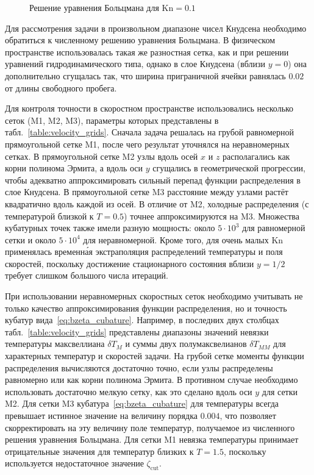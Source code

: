 \documentclass[
aps,%
12pt,%
final,%
notitlepage,%
oneside,%
onecolumn,%
nobibnotes,%
nofootinbib,%
superscriptaddress,%
noshowpacs,%
showkeys,%
floatfix,%
tightenlines,%
centertags]%
{revtex4}
\newcommand{\Kn}{\mathrm{Kn}}
\begin{document}
\begin{figure}
    \centering
    \caption{Решение уравнения Больцмана для \(\Kn=0.1\)}
    \label{fig:kn0.1}
\end{figure}

Для рассмотрения задачи в произвольном диапазоне чисел Кнудсена необходимо
обратиться к численному решению уравнения Больцмана.
В физическом пространстве использовалась такая же разностная сетка,
как и при решении уравнений гидродинамического типа,
однако в слое Кнудсена (вблизи \(y=0\)) она дополнительно сгущалась так,
что ширина приграничной ячейки равнялась \(0.02\) от длины свободного пробега.

Для контроля точности в скоростном пространстве использовались несколько сеток (M1, M2, M3),
параметры которых представлены в табл.~\ref{table:velocity_grids}.
Сначала задача решалась на грубой равномерной прямоугольной сетке M1,
после чего результат уточнялся на неравномерных сетках.
В прямоугольной сетке M2 узлы вдоль осей \(x\) и \(z\) располагались как корни полинома Эрмита,
а вдоль оси \(y\) сгущались в геометрической прогрессии,
чтобы адекватно аппроксимировать сильный перепад функции распределения в слое Кнудсена.
В прямоугольной сетке M3 расстояние между узлами растёт квадратично вдоль каждой из осей.
В отличие от M2, холодные распределения (с температурой близкой к \(T=0.5\)) точнее аппроксимируются на M3.
Множества кубатурных точек также имели разную мощность: около \(5\cdot10^3\) для равномерной сетки
и около \(5\cdot10^4\) для неравномерной.
Кроме того, для очень малых \(\Kn\) применялась временн\'{а}я экстраполяция распределений
температуры и поля скоростей, поскольку достижение стационарного состояния вблизи \(y=1/2\)
требует слишком большого числа итераций.

При использовании неравномерных скоростных сеток необходимо учитывать не только качество аппроксимирования
функции распределения, но и точность кубатур вида~\eqref{eq:bzeta_cubature}.
Например, в последних двух столбцах табл.~\ref{table:velocity_grids} представлены диапазоны значений
невязки температуры максвеллиана \(\delta T_M\) и суммы двух полумаксвелианов \(\delta T_{MM}\)
для характерных температур и скоростей задачи.
На грубой сетке моменты функции распределения вычисляются достаточно точно,
если узлы распределены равномерно или как корни полинома Эрмита.
В противном случае необходимо использовать достаточно мелкую сетку,
как это сделано вдоль оси \(y\) для сетки M2.
Для сетки M3 кубатура~\eqref{eq:bzeta_cubature} для температуры всегда превышает истинное значение
на величину порядка \(0.004\), что позволяет скорректировать на эту величину поле температур,
получаемое из численного решения уравнения Больцмана.
Для сетки M1 невязка температуры принимает отрицательные значения для температур близких к \(T=1.5\),
поскольку используется недостаточное значение \(\zeta_{\mathrm{cut}}\).
\end{document}
